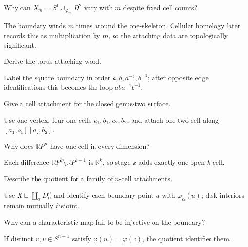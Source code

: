 \begin{problem}\label{prob:viii05-11}
Why can \(X_m=S^1\cup_{\varphi_m}D^2\) vary with \(m\) despite fixed cell counts?
\end{problem}
\begin{solution}
The boundary winds \(m\) times around the one-skeleton.  Cellular homology later records this as multiplication by \(m\), so the attaching data are topologically significant.
\end{solution}

\begin{problem}\label{prob:viii05-12}
Derive the torus attaching word.
\end{problem}
\begin{solution}
Label the square boundary in order \(a,b,a^{-1},b^{-1}\); after opposite edge identifications this becomes the loop \(aba^{-1}b^{-1}\).
\end{solution}

\begin{problem}\label{prob:viii05-13}
Give a cell attachment for the closed genus-two surface.
\end{problem}
\begin{solution}
Use one vertex, four one-cells \(a_1,b_1,a_2,b_2\), and attach one two-cell along \([a_1,b_1][a_2,b_2]\).
\end{solution}

\begin{problem}\label{prob:viii05-14}
Why does \(\mathbb RP^n\) have one cell in every dimension?
\end{problem}
\begin{solution}
Each difference \(\mathbb RP^k\setminus\mathbb RP^{k-1}\) is \(\mathbb R^k\), so stage \(k\) adds exactly one open \(k\)-cell.
\end{solution}

\begin{problem}\label{prob:viii05-15}
Describe the quotient for a family of \(n\)-cell attachments.
\end{problem}
\begin{solution}
Use \(X\sqcup\coprod_\alpha D^n_\alpha\) and identify each boundary point \(u\) with \(\varphi_\alpha(u)\); disk interiors remain mutually disjoint.
\end{solution}

\begin{problem}\label{prob:viii05-16}
Why can a characteristic map fail to be injective on the boundary?
\end{problem}
\begin{solution}
If distinct \(u,v\in S^{n-1}\) satisfy \(\varphi(u)=\varphi(v)\), the quotient identifies them.
\end{solution}

